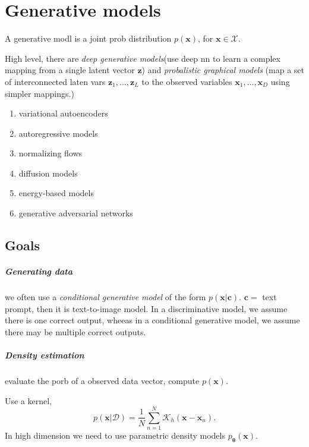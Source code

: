\documentclass[../main.tex]{subfiles}
\begin{document}
\chapter{Generative models}

A generative modl is a joint prob distribution $p(\boldsymbol{x})$, for $\boldsymbol{x} \in  \mathcal{X}$.

High level, there are \emph{deep generative models}(use deep nn to learn a complex mapping from a single latent vector $\boldsymbol{z}$) and \emph{probalistic graphical models} (map a set of interconnected laten vars $\boldsymbol{z}_{1}, \ldots ,\boldsymbol{z}_{L}$ to the observed variables $\boldsymbol{x}_{1}, \ldots ,\boldsymbol{x}_{D}$ using simpler mappings.) 

\begin{enumerate}
   \item variational autoencoders 
   \item autoregressive models
   \item normalizing flows
   \item diffusion models
   \item energy-based models
   \item generative adversarial networks
\end{enumerate}


\section{Goals}

\paragraph{Generating data}

we often use a \emph{conditional generative model} of the form $p(\boldsymbol{x} | \boldsymbol{c})$. $\boldsymbol{c}=$ text prompt, then it is text-to-image model.
In a discriminative model, we assume there is one correct output, wheeas in a conditional generative model, we assume there may be multiple correct outputs.

\paragraph{Density estimation}

evaluate the porb of a observed data vector, compute $p(\boldsymbol{x})$.

Use a kernel,
\[
p(\boldsymbol{x} | \mathcal{D}) = \frac{1}{N} \sum_{n=1}^{N} \mathcal{K}_{h}(\boldsymbol{x} - \boldsymbol{x}_{n}).
\]
In high dimension we need to use parametric density models $p_{\boldsymbol{\theta}}(\boldsymbol{x})$.
\end{document}
